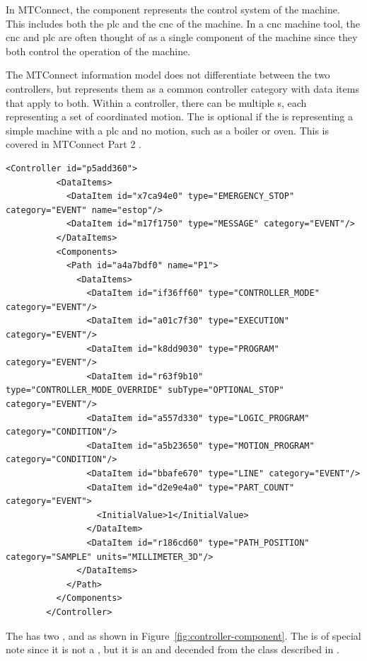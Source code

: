 In MTConnect, the  component represents the control system of the machine. This includes both the \gls{plc} and the \gls{cnc} of the machine. In a \gls{cnc} machine tool, the \gls{cnc} and \gls{plc} are often thought of as a single component of the machine since they both control the operation of the machine.

The MTConnect information model does not differentiate between the two controllers, but represents them as a common controller category with data items that apply to both. Within a controller, there can be multiple s, each representing a set of coordinated motion. The  is optional if the  is representing a simple machine with a \gls{plc} and no motion, such as a boiler or oven. This is covered in MTConnect Part 2 \cite{MTCPart2}.

\begin{lstlisting}[firstnumber=last,%
    caption={Controller and Path Components and Their Data Items},label={lst:controller-component}]
        <Controller id="p5add360">
          <DataItems>
            <DataItem id="x7ca94e0" type="EMERGENCY_STOP" category="EVENT" name="estop"/>
            <DataItem id="m17f1750" type="MESSAGE" category="EVENT"/>
          </DataItems>
          <Components>
            <Path id="a4a7bdf0" name="P1">
              <DataItems>
                <DataItem id="if36ff60" type="CONTROLLER_MODE" category="EVENT"/>
                <DataItem id="a01c7f30" type="EXECUTION" category="EVENT"/>
                <DataItem id="k8dd9030" type="PROGRAM" category="EVENT"/>
                <DataItem id="r63f9b10" type="CONTROLLER_MODE_OVERRIDE" subType="OPTIONAL_STOP" category="EVENT"/>
                <DataItem id="a557d330" type="LOGIC_PROGRAM" category="CONDITION"/>
                <DataItem id="a5b23650" type="MOTION_PROGRAM" category="CONDITION"/>
                <DataItem id="bbafe670" type="LINE" category="EVENT"/>
                <DataItem id="d2e9e4a0" type="PART_COUNT" category="EVENT">
                  <InitialValue>1</InitialValue>
                </DataItem>
                <DataItem id="r186cd60" type="PATH_POSITION" category="SAMPLE" units="MILLIMETER_3D"/>
              </DataItems>
            </Path>
          </Components>
        </Controller>
\end{lstlisting}

The  has two ,  and  as shown in Figure~\ref{fig:controller-component}. The  is of special note since it is not a , but it is an  and decended from the  class described in \cite{UAPart5}.

